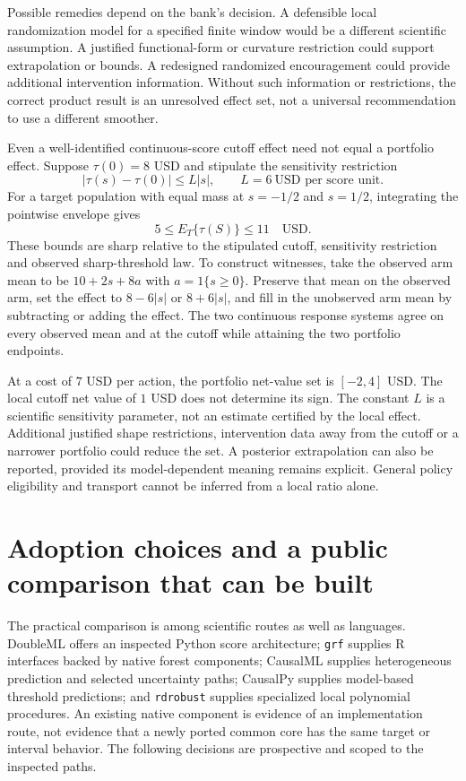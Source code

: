 Possible remedies depend on the bank's decision. A defensible local
randomization model for a specified finite window would be a different
scientific assumption. A justified functional-form or curvature restriction
could support extrapolation or bounds. A redesigned randomized encouragement
could provide additional intervention information. Without such information
or restrictions, the correct product result is an unresolved effect set,
not a universal recommendation to use a different smoother.

Even a well-identified continuous-score cutoff effect need not equal a
portfolio effect. Suppose $\tau(0)=8$ USD and stipulate the sensitivity
restriction
\[
 |\tau(s)-\tau(0)|\leq L|s|,\qquad
 L=6\ \text{USD per score unit}.
\]
For a target population with equal mass at $s=-1/2$ and $s=1/2$, integrating
the pointwise envelope gives
\begin{equation}
 5\leq E_T\{\tau(S)\}\leq11\quad\text{USD}.
 \label{exec17:s4-transport-bounds}
\end{equation}
These bounds are sharp relative to the stipulated cutoff, sensitivity
restriction and observed sharp-threshold law. To construct witnesses, take
the observed arm mean to be $10+2s+8a$ with $a=1\{s\geq0\}$. Preserve
that mean on the observed arm, set the effect to $8-6|s|$ or $8+6|s|$,
and fill in the unobserved arm mean by subtracting or adding the effect.
The two continuous response systems agree on every observed mean and at the
cutoff while attaining the two portfolio endpoints.~\citep{exec17_s4_math}

At a cost of $7$ USD per action, the portfolio net-value set is $[-2,4]$ USD.
The local cutoff net value of $1$ USD does not determine its sign. The constant
$L$ is a scientific sensitivity parameter, not an estimate certified by
the local effect. Additional justified shape restrictions, intervention data
away from the cutoff or a narrower portfolio could reduce the set. A
posterior extrapolation can also be reported, provided its model-dependent
meaning remains explicit. General policy eligibility and transport cannot be
inferred from a local ratio alone.

\section{Adoption choices and a public comparison that can be built}
\label{exec17:s4-adoption}

The practical comparison is among scientific routes as well as languages.
DoubleML offers an inspected Python score architecture; \texttt{grf} supplies
R interfaces backed by native forest components; CausalML supplies heterogeneous
prediction and selected uncertainty paths; CausalPy supplies model-based
threshold predictions; and \texttt{rdrobust} supplies specialized local
polynomial procedures. An existing native component is evidence of an
implementation route, not evidence that a newly ported common core has the
same target or interval behavior. The following decisions are prospective
and scoped to the inspected paths.~\citep{exec17_s4_paths,exec17_s4_design}

